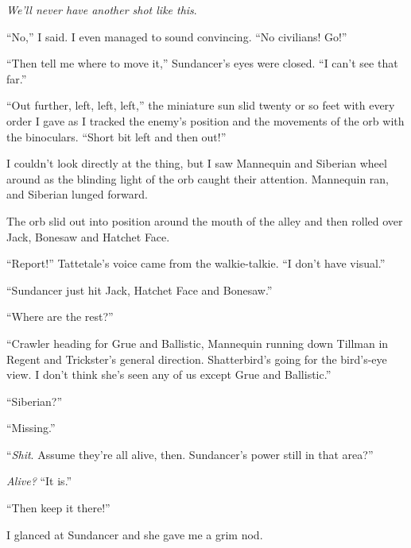 \emph{We'll never have another shot like this}.



``No,'' I said.  I even managed to sound convincing.  ``No civilians!  Go!''



``Then tell me where to move it,''  Sundancer's eyes were closed.  ``I can't see that far.''



``Out further, left, left, left,''  the miniature sun slid twenty or so feet with every order I gave as I tracked the enemy's position and the movements of the orb with the binoculars.  ``Short bit left and then out!''



I couldn't look directly at the thing, but I saw Mannequin and Siberian wheel around as the blinding light of the orb caught their attention.  Mannequin ran, and Siberian lunged forward.



The orb slid out into position around the mouth of the alley and then rolled over Jack, Bonesaw and Hatchet Face.



``Report!'' Tattetale's voice came from the walkie-talkie.  ``I don't have visual.''



``Sundancer just hit Jack, Hatchet Face and Bonesaw.''



``Where are the rest?''



``Crawler heading for Grue and Ballistic, Mannequin running down Tillman in Regent and Trickster's general direction.  Shatterbird's going for the bird's-eye view.  I don't think she's seen any of us except Grue and Ballistic.''



``Siberian?''



``Missing.''



``\emph{Shit}.  Assume they're all alive, then.  Sundancer's power still in that area?''



\emph{Alive?  }``It is.''



``Then keep it there!''



I glanced at Sundancer and she gave me a grim nod.



